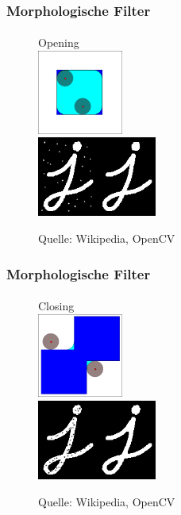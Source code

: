 \documentclass{beamer}
\begin{document}
\begin{frame}
    \frametitle{Morphologische Filter}
\framesubtitle{}

\begin{figure}[htp]
      \centering
Opening \\
    \includegraphics[width=0.25\textwidth]{img/Opening}  \\
    \includegraphics[width=0.35\textwidth]{img/opening2} 
      \caption{Quelle: Wikipedia, OpenCV}
\end{figure}

 \end{frame}
\begin{frame}
    \frametitle{Morphologische Filter}
\framesubtitle{}

\begin{figure}[htp]
      \centering
Closing \\
    \includegraphics[width=0.25\textwidth]{img/Closing}  \\
    \includegraphics[width=0.35\textwidth]{img/closing2} 
      \caption{Quelle: Wikipedia, OpenCV}
\end{figure}

 \end{frame}
\end{document}

